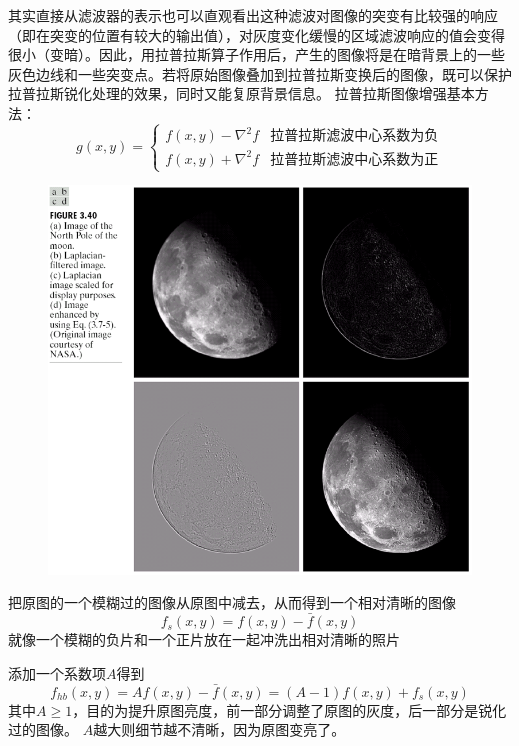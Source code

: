 其实直接从滤波器的表示也可以直观看出这种滤波对图像的突变有比较强的响应（即在突变的位置有较大的输出值），对灰度变化缓慢的区域滤波响应的值会变得很小（变暗）。因此，用拉普拉斯算子作用后，产生的图像将是在暗背景上的一些灰色边线和一些突变点。若将原始图像叠加到拉普拉斯变换后的图像，既可以保护拉普拉斯锐化处理的效果，同时又能复原背景信息。 
拉普拉斯图像增强基本方法：
\[g(x,y)=\begin{cases}
f(x,y)-\nabla^2f & \text{拉普拉斯滤波中心系数为负}\\
f(x,y)+\nabla^2f & \text{拉普拉斯滤波中心系数为正}
\end{cases}\]
\begin{figure}[H]
\centering
\includegraphics[width=0.6\linewidth]{fig/Laplacian.png}
\end{figure}

\begin{definition}
把原图的一个模糊过的图像从原图中减去，从而得到一个相对清晰的图像
\[f_s(x,y)=f(x,y)-\bar{f}(x,y)\]
就像一个模糊的负片和一个正片放在一起冲洗出相对清晰的照片
\end{definition}
\begin{definition}
添加一个系数项$A$得到
\[f_{hb}(x,y)=Af(x,y)-\bar{f}(x,y)=(A-1)f(x,y)+f_s(x,y)\]
其中$A\geq 1$，目的为提升原图亮度，前一部分调整了原图的灰度，后一部分是锐化过的图像。
$A$越大则细节越不清晰，因为原图变亮了。
\end{definition}

